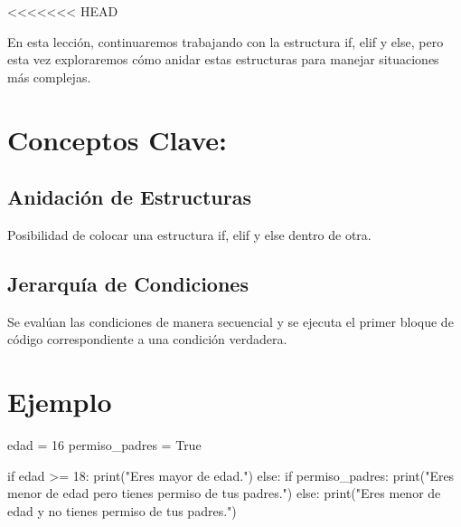 \documentclass[
  a4paper,
  DIV=11,
  numbers=noendperiod,
  onepage,
  openany]{scrreprt}
\newenvironment{Shaded}{\begin{snugshade}}{\end{snugshade}}
\newcommand{\BuiltInTok}[1]{\textcolor[rgb]{0.00,0.23,0.31}{#1}}
\newcommand{\ControlFlowTok}[1]{\textcolor[rgb]{0.00,0.23,0.31}{#1}}
\newcommand{\DecValTok}[1]{\textcolor[rgb]{0.68,0.00,0.00}{#1}}
\newcommand{\NormalTok}[1]{\textcolor[rgb]{0.00,0.23,0.31}{#1}}
\newcommand{\OperatorTok}[1]{\textcolor[rgb]{0.37,0.37,0.37}{#1}}
\newcommand{\StringTok}[1]{\textcolor[rgb]{0.13,0.47,0.30}{#1}}
\newcommand{\VariableTok}[1]{\textcolor[rgb]{0.07,0.07,0.07}{#1}}
\begin{document}
\textless\textless\textless\textless\textless\textless\textless{} HEAD

En esta lección, continuaremos trabajando con la estructura if, elif y
else, pero esta vez exploraremos cómo anidar estas estructuras para
manejar situaciones más complejas.

\hypertarget{conceptos-clave-32}{%
\section{Conceptos Clave:}\label{conceptos-clave-32}}

\hypertarget{anidaciuxf3n-de-estructuras}{%
\subsection{Anidación de
Estructuras}\label{anidaciuxf3n-de-estructuras}}

Posibilidad de colocar una estructura if, elif y else dentro de otra.

\hypertarget{jerarquuxeda-de-condiciones}{%
\subsection{Jerarquía de
Condiciones}\label{jerarquuxeda-de-condiciones}}

Se evalúan las condiciones de manera secuencial y se ejecuta el primer
bloque de código correspondiente a una condición verdadera.

\hypertarget{ejemplo-32}{%
\section{Ejemplo}\label{ejemplo-32}}

\begin{Shaded}
\begin{Highlighting}[]
\NormalTok{edad }\OperatorTok{=} \DecValTok{16}
\NormalTok{permiso\_padres }\OperatorTok{=} \VariableTok{True}

\ControlFlowTok{if}\NormalTok{ edad }\OperatorTok{\textgreater{}=} \DecValTok{18}\NormalTok{:}
    \BuiltInTok{print}\NormalTok{(}\StringTok{"Eres mayor de edad."}\NormalTok{)}
\ControlFlowTok{else}\NormalTok{:}
    \ControlFlowTok{if}\NormalTok{ permiso\_padres:}
        \BuiltInTok{print}\NormalTok{(}\StringTok{"Eres menor de edad pero tienes permiso de tus padres."}\NormalTok{)}
    \ControlFlowTok{else}\NormalTok{:}
        \BuiltInTok{print}\NormalTok{(}\StringTok{"Eres menor de edad y no tienes permiso de tus padres."}\NormalTok{)}
\end{Highlighting}
\end{Shaded}
\end{document}
